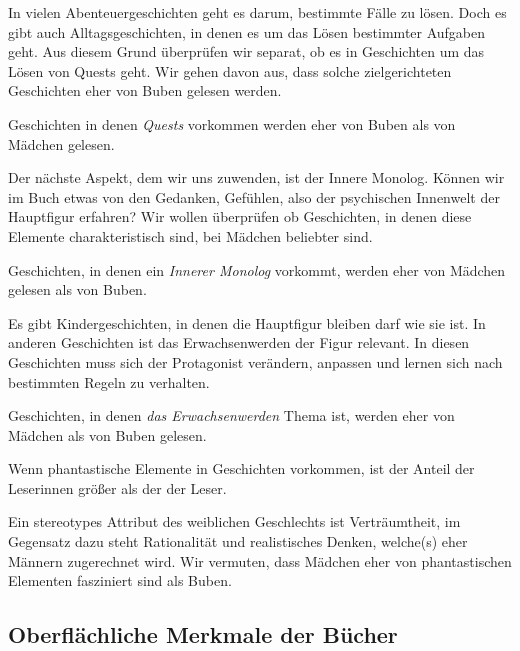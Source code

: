 In vielen Abenteuergeschichten geht es darum, bestimmte Fälle zu lösen.
Doch es gibt auch Alltagsgeschichten, in denen es um das Lösen
bestimmter Aufgaben geht. Aus diesem Grund überprüfen wir separat, ob es
in Geschichten um das Lösen von Quests geht. Wir gehen davon aus, dass
solche zielgerichteten Geschichten eher von Buben gelesen werden.

\begin{subhyp}\label{h4.2} Geschichten in denen \emph{Quests} vorkommen werden eher von Buben als von Mädchen gelesen. \end{subhyp}

Der nächste Aspekt, dem wir uns zuwenden, ist der Innere Monolog. Können
wir im Buch etwas von den Gedanken, Gefühlen, also der psychischen
Innenwelt der Hauptfigur erfahren? Wir wollen überprüfen ob Geschichten,
in denen diese Elemente charakteristisch sind, bei Mädchen beliebter
sind.

\begin{subhyp}\label{h4.3} Geschichten, in denen ein \emph{Innerer Monolog} vorkommt, werden eher von Mädchen gelesen als von Buben. \end{subhyp}

Es gibt Kindergeschichten, in denen die Hauptfigur bleiben darf wie sie
ist. In anderen Geschichten ist das Erwachsenwerden der Figur relevant.
In diesen Geschichten muss sich der Protagonist verändern, anpassen und
lernen sich nach bestimmten Regeln zu verhalten.

\begin{subhyp}\label{h4.4} Geschichten, in denen \emph{das Erwachsenwerden} Thema ist, werden eher von Mädchen als von Buben gelesen. \end{subhyp}

\begin{subhyp}\label{h4.5} Wenn phantastische Elemente in Geschichten vorkommen, ist der Anteil der Leserinnen größer als der der Leser.
\end{subhyp}

Ein stereotypes Attribut des weiblichen Geschlechts ist Verträumtheit,
im Gegensatz dazu steht Rationalität und realistisches Denken, welche(s)
eher Männern zugerechnet wird. Wir vermuten, dass Mädchen eher von
phantastischen Elementen fasziniert sind als Buben.

\subsection{Oberflächliche Merkmale der Bücher}

